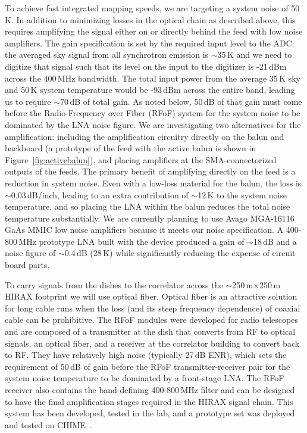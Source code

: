 \documentclass[]{spie}  %
\begin{document}
To achieve fast integrated mapping speeds, we are targeting a system noise of 50\,K. In addition to minimizing losses in the optical chain as described above, this requires amplifying the signal either on or directly behind the feed with low noise amplifiers. The gain specification is set by the required input level to the ADC: the averaged sky signal from all synchrotron emission is $\sim$35\,K and we need to digitize that signal such that its level on the input to the digitizer is -21\,dBm across the 400\,MHz bandwidth. The total input power from the average 35\,K sky and 50\,K system temperature would be -93\,dBm across the entire band, leading us to require $\sim$70\,dB of total gain. As noted below, 50\,dB of that gain must come before the Radio-Frequency over Fiber (RFoF) system for the system noise to be dominated by the LNA noise figure. We are investigating two alternatives for the amplification: including the amplification circuitry directly on the balun and backboard (a prototype of the feed with the active balun is shown in Figure~\ref{fig:activebalun}), and placing amplifiers at the SMA-connectorized outputs of the feeds. The primary benefit of amplifying directly on the feed is a reduction in system noise. Even with a low-loss material for the balun, the loss is $\sim$0.03\,dB\//inch, leading to an extra contribution of $\sim$12\,K to the system noise temperature, and so placing the LNA within the balun reduces the total noise temperature substantially. We are currently planning to use Avago MGA-16116 GaAs MMIC low noise amplifiers because it meets our noise specification. A 400-800\,MHz prototype LNA built with the device produced a gain of $\sim$18\,dB and a noise figure of $\sim$0.4\,dB (28\,K) while significantly reducing the expense of circuit board parts. \newline


To carry signals from the dishes to the correlator across the $\sim$250\,m$\times$250\,m HIRAX footprint we will use optical fiber. Optical fiber is an attractive solution for long cable runs when the loss (and its steep frequency dependence) of coaxial cable can be prohibitive. The RFoF modules were developed for radio telescopes and are composed of a transmitter at the dish that converts from RF to optical signals, an optical fiber, and a receiver at the correlator building to convert back to RF. They have relatively high noise (typically 27\,dB ENR), which sets the requirement of 50\,dB of gain before the RFoF transmitter-receiver pair for the system noise temperature to be dominated by a front-stage LNA. The RFoF receiver also contains the band-defining 400-800\,MHz filter and can be designed to have the final amplification stages required in the HIRAX signal chain. This system has been developed, tested in the lab, and a prototype set was deployed and tested on CHIME~\cite{2013JInst...810003M}. \newline      
\end{document}
